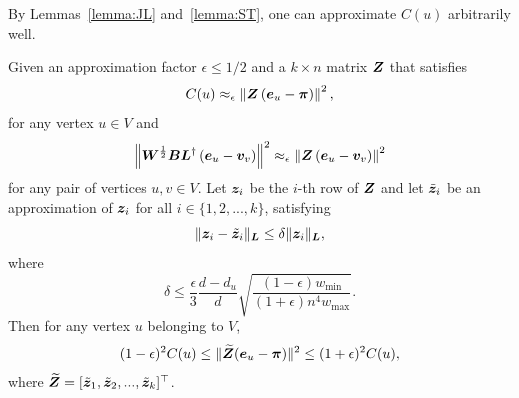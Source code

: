 \documentclass[10pt,twocolumn,twoside]{IEEEtran}
\begin{document}
By Lemmas~\ref{lemma:JL} and~\ref{lemma:ST}, one can approximate \(C(u)\) arbitrarily well.

\begin{lemma}\label{lem:error1}
    Given an approximation factor \(\epsilon \le 1/2\) and a \(k\times n\) matrix \(\boldsymbol{Z}\) that satisfies
    \begin{equation*}
        C(u)\approx_\epsilon\left\Vert\boldsymbol{Z}\left( \boldsymbol{e}_u-\boldsymbol{\pi} \right)\right\Vert^2,
    \end{equation*}
    for any vertex \(u\in V\) and
    \begin{equation*}
        \left\Vert\boldsymbol{W}^{\frac{1}{2}}\boldsymbol{B}\boldsymbol{L}^\dagger\left( \boldsymbol{e}_u-\boldsymbol{v}_v \right)\right\Vert^2\approx_\epsilon\left\Vert\boldsymbol{Z}\left( \boldsymbol{e}_u-\boldsymbol{v}_v \right)\right\Vert^2
    \end{equation*}
    for any pair of vertices \(u,v \in V\).
    Let \(\boldsymbol{z}_i\) be the \(i\)-th row of \(\boldsymbol{Z}\) and let \(\tilde{\boldsymbol{z}}_i\) be an approximation of \(\boldsymbol{z}_i\) for all \(i \in \{1,2,...,k\}\), satisfying
    \begin{equation}\label{EE13} \|\boldsymbol{z}_i-\tilde{\boldsymbol{z}}_i\|_{\boldsymbol{L}}\le\delta
        \|\boldsymbol{z}_{i}\|_{\boldsymbol{L}},
    \end{equation}
    where
    \begin{equation}\label{EE14}
        \delta \leq  \frac{\epsilon }{3} \frac{d-d_u}{d}
        \sqrt{\frac{(1-\epsilon) w_{\min}}{(1+\epsilon) n^4 w_{\max}}}.
    \end{equation}
    Then for any vertex \(u\) belonging to \(V\),
    \begin{align}
        \label{EE15}
        (1 - \epsilon)^2  C(u)
        \leq
        \|\widetilde{\boldsymbol{Z}}  (\boldsymbol{e}_{u} - \boldsymbol{\pi})\|^2
        \leq
        (1 + \epsilon)^2  C(u),
    \end{align}
    where \(\widetilde{\boldsymbol{Z}} = [\tilde{\boldsymbol{z}}_1, \tilde{\boldsymbol{z}}_2, ..., \tilde{\boldsymbol{z}}_k]^\top\).
\end{lemma}
\end{document}
